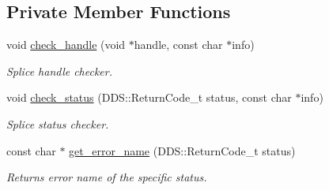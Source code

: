 \subsection*{Private Member Functions}
\begin{DoxyCompactItemize}
\item 
void \hyperlink{classMadara_1_1Transport_1_1Splice__DDS__Transport_a0af616ba8090a4ec6d22ca580cf5e85d}{check\_\-handle} (void $\ast$handle, const char $\ast$info)
\begin{DoxyCompactList}\small\item\em Splice handle checker. \item\end{DoxyCompactList}\item 
void \hyperlink{classMadara_1_1Transport_1_1Splice__DDS__Transport_a8b1aaf299a50bf4b1d54feca63aff5dd}{check\_\-status} (DDS::ReturnCode\_\-t status, const char $\ast$info)
\begin{DoxyCompactList}\small\item\em Splice status checker. \item\end{DoxyCompactList}\item 
const char $\ast$ \hyperlink{classMadara_1_1Transport_1_1Splice__DDS__Transport_aee1a4458f4ed216f0988a3460c40d1b0}{get\_\-error\_\-name} (DDS::ReturnCode\_\-t status)
\begin{DoxyCompactList}\small\item\em Returns error name of the specific status. \item\end{DoxyCompactList}\end{DoxyCompactItemize}
